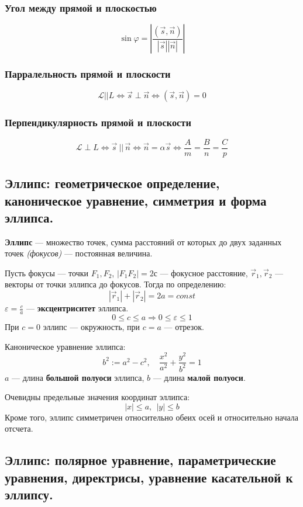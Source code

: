 \subsubsection{Угол между прямой и плоскостью}
$$\sin\varphi=\left|\frac{(\vec s, \vec n)}{|\vec s||\vec n|}\right|$$
\subsubsection{Парралельность прямой и плоскости}
$$\mathcal L||L\Leftrightarrow \vec s\perp \vec n\Leftrightarrow (\vec s,\vec n)=0$$
\subsubsection{Перпендикулярность прямой и плоскости}
$$\mathcal L\perp L\Leftrightarrow \vec s\ ||\, \vec n\Leftrightarrow \vec n=\alpha\vec s\Leftrightarrow\frac{A}{m}=\frac{B}{n}=\frac{C}{p}$$

\subsection{Эллипс: геометрическое определение, каноническое уравнение, симметрия и форма эллипса.}
\begin{definition}
    \textbf{Эллипс} --- множество точек, сумма расстояний от которых до двух заданных точек \textit{(фокусов)} --- постоянная величина.
\end{definition}

Пусть фокусы --- точки $F_1, F_2$, $|F_1F_2|=2с$ --- фокусное расстояние, $\vec r_1, \vec r_2$ --- векторы от точки эллипса до фокусов. Тогда по определению:
$$|\vec r_1|+|\vec r_2|=2a=const$$
$\varepsilon=\frac{c}{a}$ --- \textbf{эксцентриситет} эллипса.
$$0\leq c\leq a\Rightarrow 0\leq \varepsilon\leq 1$$
При $c=0$ эллипс --- окружность, при $c=a$ --- отрезок.

Каноническое уравнение эллипса:
$$b^2:=a^2-c^2,\quad \frac{x^2}{a^2}+\frac{y^2}{b^2}=1$$
$a$ --- длина \textbf{большой полуоси} эллипса, $b$ --- длина \textbf{малой полуоси}.

Очевидны предельные значения координат эллипса:
$$|x|\leq a, \ \ |y|\leq b$$
Кроме того, эллипс симметричен относительно обеих осей и относительно начала отсчета.

\subsection{Эллипс: полярное
    уравнение, параметрические уравнения, директрисы, уравнение касательной к
    эллипсу.}

